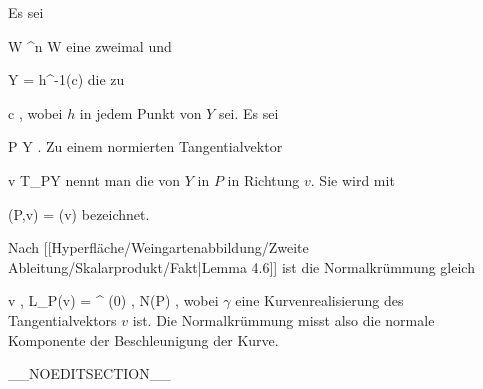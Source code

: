 {}
{

Es sei

\mavergleichskette
{\vergleichskette
{ W
}
{ \subseteq }{ \R^n
}
{  }{
}
{    }{
}
{   }{
}
}
{}{}{}
 { W } { \R
} {}
eine zweimal
und

\mavergleichskette
{\vergleichskette
{ Y
}
{ = }{ h^{-1}(c)
}
{  }{
}
{    }{
}
{   }{
}
}
{}{}{}
die
zu

\mavergleichskette
{\vergleichskette
{ c
}
{ \in }{ \R
}
{  }{
}
{    }{
}
{   }{
}
}
{}{}{,}
wobei $h$ in jedem Punkt von $Y$
sei. Es sei

\mavergleichskette
{\vergleichskette
{ P
}
{ \in }{ Y
}
{  }{
}
{    }{
}
{   }{
}
}
{}{}{.}
Zu einem normierten Tangentialvektor

\mavergleichskette
{\vergleichskette
{ v
}
{ \in }{ T_PY
}
{  }{
}
{    }{
}
{   }{
}
}
{}{}{}
nennt man
 die
von $Y$ in $P$ in Richtung $v$. Sie wird mit

\mavergleichskette
{\vergleichskette
{ \kappa(P,v)
}
{ = }{ \kappa(v)
}
{  }{
}
{    }{
}
{   }{
}
}
{}{}{}
bezeichnet.

}

Nach
[[Hyperfläche/Weingartenabbildung/Zweite Ableitung/Skalarprodukt/Fakt|Lemma 4.6]]
ist die Normalkrümmung gleich

\mavergleichskettedisp
{\vergleichskette
{ \left\langle  v  ,  L_P(v)  \right\rangle
}
{ =} { \left\langle  \gamma^{\prime \prime} (0)  ,  N(P)  \right\rangle
}
{ } {
}
{ } {
}
{ } {
}
}
{}{}{,}
wobei $\gamma$ eine Kurvenrealisierung des Tangentialvektors $v$ ist. Die Normalkrümmung misst also die normale Komponente der Beschleunigung der Kurve.

__NOEDITSECTION__

